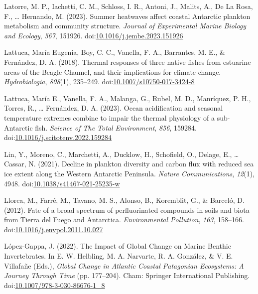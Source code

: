 \documentclass[
]{article}
\newlength{\cslhangindent}
\newlength{\cslentryspacingunit} %
\newenvironment{CSLReferences}[2] %
 {%
  \setlength{\parindent}{0pt}
  \ifodd #1
  \let\oldpar\par
  \def\par{\hangindent=\cslhangindent\oldpar}
  \fi
  \setlength{\parskip}{#2\cslentryspacingunit}
 }%
 {}
\begin{document}
\begin{CSLReferences}{1}{0}
\leavevmode{}%
Latorre, M. P., Iachetti, C. M., Schloss, I. R., Antoni, J., Malits, A.,
De La Rosa, F., \ldots{} Hernando, M. (2023). Summer heatwaves affect
coastal {Antarctic} plankton metabolism and community structure.
\emph{Journal of Experimental Marine Biology and Ecology}, \emph{567},
151926.
doi:\href{https://doi.org/10.1016/j.jembe.2023.151926}{10.1016/j.jembe.2023.151926}

\leavevmode{}%
Lattuca, María Eugenia, Boy, C. C., Vanella, F. A., Barrantes, M. E., \&
Fernández, D. A. (2018). Thermal responses of three native fishes from
estuarine areas of the {Beagle Channel}, and their implications for
climate change. \emph{Hydrobiologia}, \emph{808}(1), 235--249.
doi:\href{https://doi.org/10.1007/s10750-017-3424-8}{10.1007/s10750-017-3424-8}

\leavevmode{}%
Lattuca, María E., Vanella, F. A., Malanga, G., Rubel, M. D., Manríquez,
P. H., Torres, R., \ldots{} Fernández, D. A. (2023). Ocean acidification
and seasonal temperature extremes combine to impair the thermal
physiology of a sub-{Antarctic} fish. \emph{Science of The Total
Environment}, \emph{856}, 159284.
doi:\href{https://doi.org/10.1016/j.scitotenv.2022.159284}{10.1016/j.scitotenv.2022.159284}

\leavevmode{}%
Lin, Y., Moreno, C., Marchetti, A., Ducklow, H., Schofield, O., Delage,
E., \ldots{} Cassar, N. (2021). Decline in plankton diversity and carbon
flux with reduced sea ice extent along the {Western Antarctic
Peninsula}. \emph{Nature Communications}, \emph{12}(1), 4948.
doi:\href{https://doi.org/10.1038/s41467-021-25235-w}{10.1038/s41467-021-25235-w}

\leavevmode{}%
Llorca, M., Farré, M., Tavano, M. S., Alonso, B., Koremblit, G., \&
Barceló, D. (2012). Fate of a broad spectrum of perfluorinated compounds
in soils and biota from {Tierra} del {Fuego} and {Antarctica}.
\emph{Environmental Pollution}, \emph{163}, 158--166.
doi:\href{https://doi.org/10.1016/j.envpol.2011.10.027}{10.1016/j.envpol.2011.10.027}

\leavevmode{}%
López-Gappa, J. (2022). The {Impact} of {Global Change} on {Marine
Benthic Invertebrates}. In E. W. Helbling, M. A. Narvarte, R. A.
González, \& V. E. Villafañe (Eds.), \emph{Global {Change} in {Atlantic
Coastal Patagonian Ecosystems}: {A Journey Through Time}} (pp.
177--204). {Cham}: {Springer International Publishing}.
doi:\href{https://doi.org/10.1007/978-3-030-86676-1_8}{10.1007/978-3-030-86676-1\_8}


\end{CSLReferences}
\end{document}
